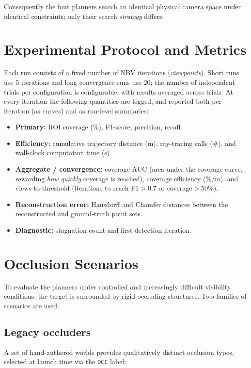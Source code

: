 Consequently the four planners search an identical physical camera space
under identical constraints; only their search \emph{strategy} differs.

\section{Experimental Protocol and Metrics}
\label{sec:protocol}

Each run consists of a fixed number of NBV iterations (\emph{viewpoints}).
Short runs use $5$ iterations and long convergence runs use $20$; the number
of independent trials per configuration is configurable, with results
averaged across trials. At every iteration the following quantities are
logged, and reported both per iteration (as curves) and as run-level
summaries:

\begin{itemize}
  \item \textbf{Primary:} ROI coverage (\%), F1-score, precision, recall.
  \item \textbf{Efficiency:} cumulative trajectory distance (m),
        ray-tracing calls (\#), and wall-clock computation time (s).
  \item \textbf{Aggregate / convergence:} coverage AUC (area under the
        coverage curve, rewarding \emph{how quickly} coverage is reached),
        coverage efficiency (\%/m), and views-to-threshold
        (iterations to reach F1$>0.7$ or coverage$>50\%$).
  \item \textbf{Reconstruction error:} Hausdorff and Chamfer distances
        between the reconstructed and ground-truth point sets.
  \item \textbf{Diagnostic:} stagnation count and first-detection iteration.
\end{itemize}

\section{Occlusion Scenarios}
\label{sec:occlusion}

To evaluate the planners under controlled and increasingly difficult
visibility conditions, the target is surrounded by rigid occluding
structures. Two families of scenarios are used.

\subsection{Legacy occluders}
A set of hand-authored worlds provides qualitatively distinct occlusion
types, selected at launch time via the \texttt{OCC} label:


